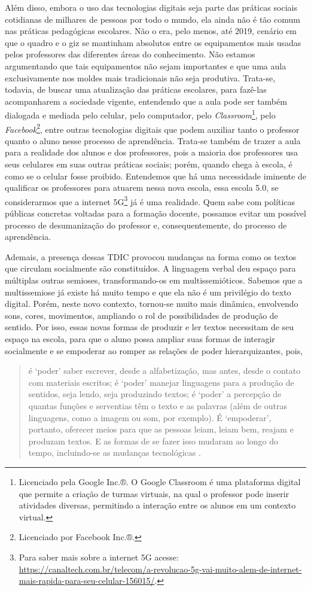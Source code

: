 \documentclass{textolivre}
\begin{document}
Além disso, embora o uso das tecnologias digitais seja parte das práticas sociais cotidianas de milhares de pessoas por todo o mundo, ela ainda não é tão comum nas práticas pedagógicas escolares. Não o era, pelo menos,  até 2019, cenário em que o quadro e o giz se mantinham absolutos entre os equipamentos mais usadas pelos professores das diferentes áreas do conhecimento. Não estamos argumentando que tais equipamentos não sejam importantes e que uma aula exclusivamente nos moldes mais tradicionais não seja produtiva. Trata-se, todavia, de buscar uma atualização das práticas escolares, para fazê-las acompanharem a sociedade vigente, entendendo que a aula pode ser também dialogada e mediada pelo celular, pelo computador, pelo \emph{Classroom}\footnote{Licenciado pela Google Inc.®. O Google Classroom é uma plataforma digital que permite a criação de turmas virtuais, na qual o professor pode inserir atividades diversas, permitindo a interação entre os alunos em um contexto virtual.}, pelo \emph{Facebook}\footnote{Licenciado por Facebook Inc.®.}, entre outras tecnologias digitais que podem auxiliar tanto o professor quanto o aluno nesse processo de aprendência. Trata-se também de trazer a aula para a realidade dos alunos e dos professores, pois a maioria dos professores usa seus celulares em suas outras práticas sociais; porém, quando chega à escola, é como se o celular fosse proibido. Entendemos que há uma necessidade iminente de qualificar os professores para atuarem nessa nova escola, essa escola 5.0, se considerarmos que a internet 5G\footnote{Para saber mais sobre a internet 5G acesse: \url{https://canaltech.com.br/telecom/a-revolucao-5g-vai-muito-alem-de-internet-mais-rapida-para-seu-celular-156015/}.} já é uma realidade. Quem sabe com políticas públicas concretas voltadas para a formação docente, possamos evitar um possível processo de desumanização do professor e, consequentemente, do processo de aprendência.

Ademais, a presença dessas TDIC provocou mudanças na forma como os textos que circulam socialmente são constituídos. A linguagem verbal deu espaço para múltiplas outras semioses, transformando-os em multissemióticos. Sabemos que a multissemiose já existe há muito tempo e que ela não é um privilégio do texto digital. Porém, neste novo contexto, tornou-se muito mais dinâmica, envolvendo sons, cores, movimentos, ampliando o rol de possibilidades de produção de sentido. Por isso, essas novas formas de produzir e ler textos necessitam de seu espaço na escola, para que o aluno possa ampliar suas formas de interagir socialmente e se empoderar ao romper as relações de poder hierarquizantes, pois,
\begin{quote}
é ‘poder’ saber escrever, desde a alfabetização, mas antes, desde o contato com materiais escritos; é ‘poder’ manejar linguagens para a produção de sentidos, seja lendo, seja produzindo textos; é ‘poder’ a percepção de quantas funções e serventias têm o texto e as palavras (além de outras linguagens, como a imagem ou som, por exemplo). É ‘empoderar’, portanto, oferecer meios para que as pessoas leiam, leiam bem, reajam e produzam textos. E as formas de se fazer isso mudaram ao longo do tempo, incluindo-se as mudanças tecnológicas \cite[p.~85]{ribeiro2018}.
\end{quote}
\end{document}
